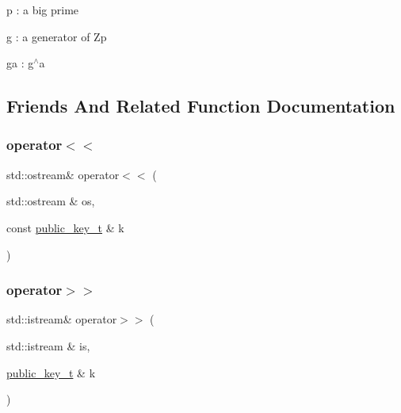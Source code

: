 \begin{DoxyItemize}
\item p \+: a big prime
\item g \+: a generator of Zp
\item ga \+: g$^\wedge$a 
\end{DoxyItemize}

\subsection{Friends And Related Function Documentation}
\mbox{\label{structelGamal_1_1public__key__t_a046edae80d5819c231b4c2dc64986202}} 
\subsubsection{\texorpdfstring{operator$<$$<$}{operator<<}}
{\footnotesize\ttfamily std\+::ostream\& operator$<$$<$ (\begin{DoxyParamCaption}\item[{std\+::ostream \&}]{os,  }\item[{const \mbox{\hyperlink{structelGamal_1_1public__key__t}{public\+\_\+key\+\_\+t}} \&}]{k }\end{DoxyParamCaption})\hspace{0.3cm}{\ttfamily [friend]}}

\mbox{\label{structelGamal_1_1public__key__t_a9d8e3db0096733e107dfb53f121c9e8e}} 
\subsubsection{\texorpdfstring{operator$>$$>$}{operator>>}}
{\footnotesize\ttfamily std\+::istream\& operator$>$$>$ (\begin{DoxyParamCaption}\item[{std\+::istream \&}]{is,  }\item[{\mbox{\hyperlink{structelGamal_1_1public__key__t}{public\+\_\+key\+\_\+t}} \&}]{k }\end{DoxyParamCaption})\hspace{0.3cm}{\ttfamily [friend]}}



